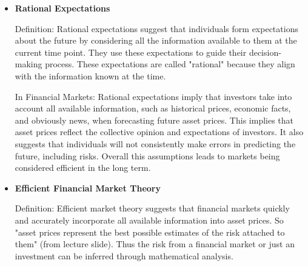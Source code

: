 \documentclass{article}
\begin{document}
\begin{itemize}
    \item \textbf{Rational Expectations}

Definition: Rational expectations suggest that individuals form expectations about the future by considering all the information available to them at the current time point. They use these expectations to guide their decision-making process. These expectations are called "rational" because they align with the information known at the time.

In Financial Markets: Rational expectations imply that investors take into account all available information, such as historical prices, economic facts, and obviously news, when forecasting future asset prices. This implies that asset prices reflect the collective opinion and expectations of investors. It also suggests that individuals will not consistently make errors in predicting the future, including risks. Overall this assumptions leads to markets being considered efficient in the long term.


\item \textbf{Efficient Financial Market Theory}

Definition: Efficient market theory suggests that financial markets quickly and accurately incorporate all available information into asset prices. So "asset prices represent the best possible estimates of the risk attached to them" (from lecture slide). Thus the risk from a financial market or just an investment can be inferred through mathematical analysis.
\end{itemize}
\end{document}
